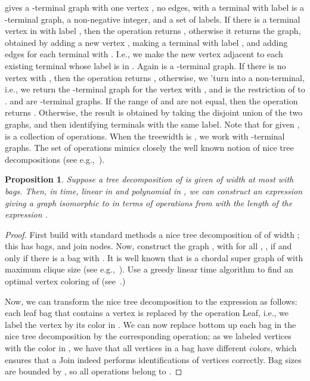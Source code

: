 \documentclass[a4paper,11pt]{article}
\newtheorem{proposition}[lemma]{Proposition}
\theoremstyle{definition}
\theoremstyle{remark}
\begin{document}
\vskip 0.3cm
 gives a -terminal graph with one vertex ,
  no edges, with  a terminal with label 
  \vskip 0.3cm
    is a
  -terminal graph,  a non-negative integer, and  a set of labels.  If there is a terminal vertex in
   with label , then the operation returns , otherwise it
  returns the graph, obtained by adding a new vertex , making  a
  terminal with label , and adding edges  for each
  terminal  with .  I.e., we make the new vertex
  adjacent to each existing terminal whose label is in .  \vskip
  0.3cm
   Again  is a
  -terminal graph.  If there is no vertex  with
  , then the operation returns , otherwise, we 'turn 
  into a non-terminal, i.e., we return the -terminal graph
   for the vertex  with , and  is
  the restriction of  to .  \vskip 0.3cm
    and  are
  -terminal graphs.  If the range of  and  are not equal,
  then the operation returns .  Otherwise, the result is obtained
  by taking the disjoint union of the two graphs, and then identifying
  terminals with the same label.
\vskip 0.3cm Note that for given ,  is a collection of  operations.  When the treewidth is , we
  work with -terminal graphs.  The set of operations mimics
  closely the well known notion of nice tree decompositions (see
  e.g.,~\cite{Kloks93,Bodlaender98}).


\begin{proposition}
  Suppose a tree decomposition of  is given of width at most 
  with  bags.  Then, in time, linear in  and polynomial in ,
  we can construct an expression giving a graph isomorphic to  in
  terms of operations from  with the length of the expression
  .
\end{proposition}

\begin{proof}
  First build with standard methods a nice tree decomposition of 
  of width ; this has  bags, and  join nodes.  Now,
  construct the graph , with for all , , if and only if there is a bag  with .  It is well
  known that  is a chordal super graph of  with maximum clique
  size  (see e.g.,~\cite{Bodlaender98}).  Use a greedy linear
  time algorithm to find an optimal vertex coloring  of 
  (see~\cite[Section 4.7]{Golumbic80}.)
  
  Now, we can transform the nice tree decomposition to the expression
  as follows: each leaf bag that contains a vertex  is replaced by
  the operation Leaf, i.e., we label the vertex by its color
  in .  We can now replace bottom up each bag in the nice tree
  decomposition by the corresponding operation; as we labeled vertices
  with the color in , we have that all vertices in a bag have
  different colors, which ensures that a Join indeed performs
  identifications of vertices correctly.  Bag sizes are bounded by
  , so all operations belong to .
\end{proof}
\end{document}
